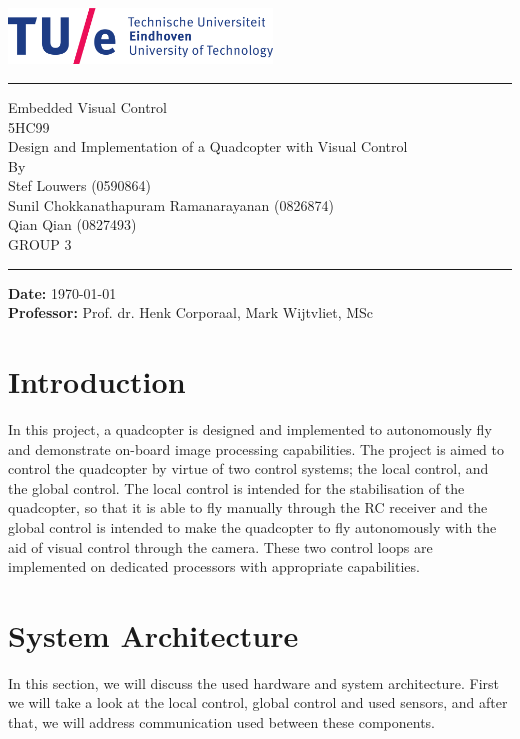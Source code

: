 \documentclass[11pt, a4paper, onecolumn, oneside, parskip=half]{scrartcl}
\newcommand{\authors}{\\Stef Louwers (0590864)\\
Sunil Chokkanathapuram Ramanarayanan (0826874)\\
Qian Qian (0827493)\\
GROUP 3
} %
\newcommand{\prof}{Prof. dr. Henk Corporaal, Mark Wijtvliet, MSc} %
\newcommand{\doctitle}{Design and Implementation of a Quadcopter with Visual Control} %
\newcommand{\subcode}{5HC99} %
\newcommand{\docsubject}{Embedded Visual Control} %
\newcommand{\HRule}[2]{\noindent\rule[#1]{\linewidth}{#2}}
\newcommand{\vlinespace}[1]{\vspace*{#1\baselineskip}}
\begin{document}
\begin{titlepage}

\sffamily
\hfill \centering
\includegraphics[width=7cm]{tuelogo}
\HRule{11pt}{2pt}

\vfill
\Large{\docsubject{} \\\subcode{} \\}
\vlinespace{1}
\huge{\doctitle{}\\}
\vlinespace{8}
\vfill
\large
By \authors{}\\
\vfill
\HRule{11pt}{2pt}
\raggedright
\textbf{Date: } \today \\
\textbf{Professor:} \prof{}

\end{titlepage}

\tableofcontents
\newpage
\pagestyle{scrheadings}

\section{Introduction}
In this project, a quadcopter is designed and implemented to autonomously fly and demonstrate on-board image processing capabilities. The project is aimed to control the quadcopter by virtue of two control systems; the local control, and the global control. The local control is intended for the stabilisation of the quadcopter, so that it is able to fly manually through the RC receiver and the global control is intended to make the quadcopter to fly autonomously with the aid of visual control through the camera. These two control loops are implemented on dedicated processors with appropriate capabilities.


\section{System Architecture}
\label{sec:arch}
In this section, we will discuss the used hardware and system architecture. First we will take a look at the local control, global control and used sensors, and after that, we will address communication used between these components.
\end{document}
